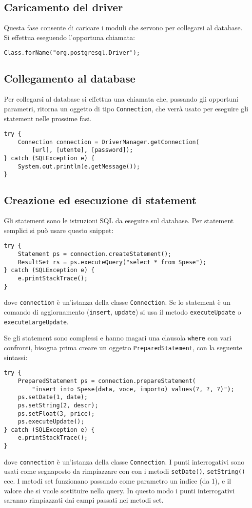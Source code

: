 \documentclass[a4paper, 10pt]{article}
\begin{document}
\subsection{Caricamento del driver}
Questa fase consente di caricare i moduli che servono per collegarsi al database. Si effettua eseguendo l'opportuna chiamata:
\lstset{language=Java}
\begin{lstlisting}
Class.forName("org.postgresql.Driver");
\end{lstlisting}

\subsection{Collegamento al database}
Per collegarsi al database si effettua una chiamata che, passando gli opportuni parametri, ritorna un oggetto di tipo \lstinline|Connection|, che verrà usato per eseguire gli statement nelle prossime fasi.

\begin{lstlisting}
try {
	Connection connection = DriverManager.getConnection(
		[url], [utente], [password]);
} catch (SQLException e) {
	System.out.println(e.getMessage());
}
\end{lstlisting}

\subsection{Creazione ed esecuzione di statement}
Gli statement sono le istruzioni SQL da eseguire sul database. Per statement semplici si può usare questo snippet:
\begin{lstlisting}
try {
	Statement ps = connection.createStatement();
	ResultSet rs = ps.executeQuery("select * from Spese");
} catch (SQLException e) {
	e.printStackTrace();
}
\end{lstlisting}
dove \lstinline|connection| è un'istanza della classe \lstinline|Connection|. Se lo statement è un comando di aggiornamento (\lstinline|insert|, \lstinline|update|) si usa il metodo \lstinline|executeUpdate| o \lstinline|executeLargeUpdate|.

Se gli statement sono complessi e hanno magari una clausola \lstinline|where| con vari confronti, bisogna prima creare un oggetto \lstinline|PreparedStatement|, con la seguente sintassi:

\begin{lstlisting}
try {
	PreparedStatement ps = connection.prepareStatement(
		"insert into Spese(data, voce, importo) values(?, ?, ?)");
	ps.setDate(1, date);
	ps.setString(2, descr);
	ps.setFloat(3, price);
	ps.executeUpdate();
} catch (SQLException e) {
	e.printStackTrace();
}
\end{lstlisting}
dove \lstinline|connection| è un'istanza della classe \lstinline|Connection|. I punti interrogativi sono usati come segnaposto da rimpiazzare con con i metodi \lstinline|setDate()|, \lstinline|setString()| ecc.
I metodi set funzionano passando come parametro un indice (da 1), e il valore che si vuole sostituire nella query. In questo modo i punti interrogativi saranno rimpiazzati dai campi passati nei metodi set. \\
\end{document}
